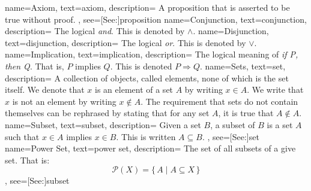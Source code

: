 {
    name={Axiom},
    text={axiom},
    description={
        A proposition that is asserted to be true without proof.
    },
    see=[See:]{proposition}
}
{
    name={Conjunction},
    text={conjunction},
    description={
        The logical \textit{and}. This is denoted by $\land$.
    }
}
{
    name={Disjunction},
    text={disjunction},
    description={
        The logical \textit{or}. This is denoted by $\lor$.
    }
}
{
    name={Implication},
    text={implication},
    description={
        The logical meaning of \textit{if P, then Q}. That is, $P$ implies $Q$.
        This is denoted $P\Rightarrow{Q}$.
    }
}
{
    name={Sets},
    text={set},
    description={
        A collection of objects, called elements, none of which is the set
        itself. We denote that $x$ is an element of a set $A$ by writing
        $x\in{A}$. We write that $x$ is not an element by writing
        $x\notin{A}$. The requirement that sets do not contain themselves can
        be rephrased by stating that for any set $A$, it is true that
        $A\notin{A}$.
    }
}
{
    name={Subset},
    text={subset},
    description={
        Given a set $B$, a subset of $B$ is a set $A$ such that $x\in{A}$
        implies $x\in{B}$. This is written $A\subseteq{B}$.
    },
    see=[See:]{set}
}
{
    name={Power Set},
    text={power set},
    description={
        The set of all subsets of a give set. That is:
        \begin{equation*}
            \mathcal{P}(X)=\{\,A\;|\;A\subseteq{X}\,\}
        \end{equation*}
    },
    see=[See:]{subset}
}

